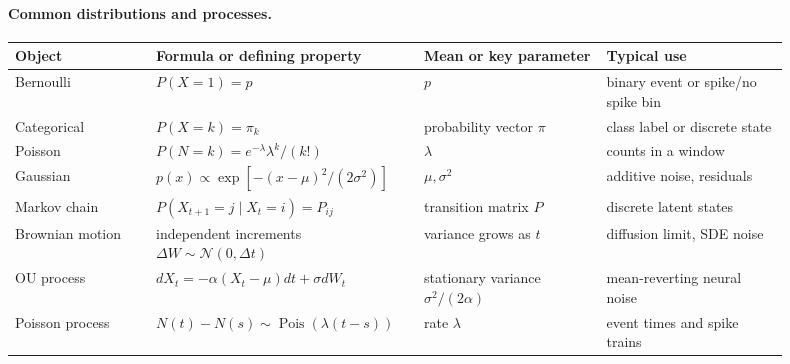 \paragraph{Common distributions and processes.}
\begin{center}
\small
\setlength{\tabcolsep}{2pt}
\renewcommand{\arraystretch}{1.12}
\begin{tabular}{p{0.17\linewidth}p{0.29\linewidth}p{0.22\linewidth}p{0.22\linewidth}}
\toprule
Object & Formula or defining property & Mean or key parameter & Typical use \\
\midrule
Bernoulli & \(P(X=1)=p\) & \(p\) & binary event or spike/no spike bin \\
Categorical & \(P(X=k)=\pi_k\) & probability vector \(\pi\) & class label or discrete state \\
Poisson & \(P(N=k)=e^{-\lambda}\lambda^k/(k\mathord{!})\) & \(\lambda\) & counts in a window \\
Gaussian & \(p(x)\propto \exp[-(x-\mu)^2/(2\sigma^2)]\) & \(\mu,\sigma^2\) & additive noise, residuals \\
Markov chain & \(P(X_{t+1}=j\mid X_t=i)=P_{ij}\) & transition matrix \(P\) & discrete latent states \\
Brownian motion & independent increments \(\Delta W\sim\mathcal N(0,\Delta t)\) & variance grows as \(t\) & diffusion limit, SDE noise \\
OU process & \(dX_t=-\alpha(X_t-\mu)dt+\sigma dW_t\) & stationary variance \(\sigma^2/(2\alpha)\) & mean-reverting neural noise \\
Poisson process & \(N(t)-N(s)\sim\operatorname{Pois}(\lambda(t-s))\) & rate \(\lambda\) & event times and spike trains \\
\bottomrule
\end{tabular}
\end{center}

